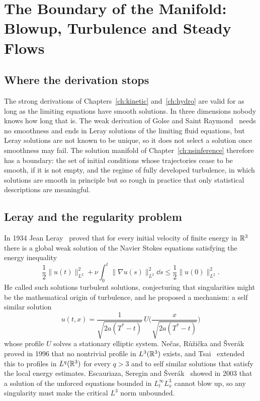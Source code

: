 \chapter{The Boundary of the Manifold: Blowup, Turbulence and Steady Flows}
\label{ch:boundary}

\section{Where the derivation stops}

The strong derivations of Chapters~\ref{ch:kinetic} and~\ref{ch:hydro} are valid for as long as the limiting equations have smooth solutions. In three dimensions nobody knows how long that is. The weak derivation of Golse and Saint Raymond~\cite{golsesaintraymond2004} needs no smoothness and ends in Leray solutions of the limiting fluid equations, but Leray solutions are not known to be unique, so it does not select a solution once smoothness may fail. The solution manifold of Chapter~\ref{ch:nsinference} therefore has a boundary: the set of initial conditions whose trajectories cease to be smooth, if it is not empty, and the regime of fully developed turbulence, in which solutions are smooth in principle but so rough in practice that only statistical descriptions are meaningful.

\section{Leray and the regularity problem}

In 1934 Jean Leray~\cite{leray1934} proved that for every initial velocity of finite energy in $\mathbb{R}^3$ there is a global weak solution of the Navier Stokes equations satisfying the energy inequality
\[
\frac12\|u(t)\|_{L^2}^2+\nu\int_0^t\|\nabla u(s)\|_{L^2}^2\dd s\leq\frac12\|u(0)\|_{L^2}^2.
\]
He called such solutions turbulent solutions, conjecturing that singularities might be the mathematical origin of turbulence, and he proposed a mechanism: a self similar solution
\[
u(t,x) = \frac{1}{\sqrt{2a(T^*-t)}}\,U\Big(\frac{x}{\sqrt{2a(T^*-t)}}\Big)
\]
whose profile $U$ solves a stationary elliptic system. Ne\v{c}as, R\r{u}\v{z}i\v{c}ka and \v{S}ver\'ak~\cite{necas1996} proved in 1996 that no nontrivial profile in $L^3(\mathbb{R}^3)$ exists, and Tsai~\cite{tsai1998} extended this to profiles in $L^q(\mathbb{R}^3)$ for every $q>3$ and to self similar solutions that satisfy the local energy estimates. Escauriaza, Seregin and \v{S}ver\'ak~\cite{ess2003} showed in 2003 that a solution of the unforced equations bounded in $L^\infty_tL^3_x$ cannot blow up, so any singularity must make the critical $L^3$ norm unbounded.

